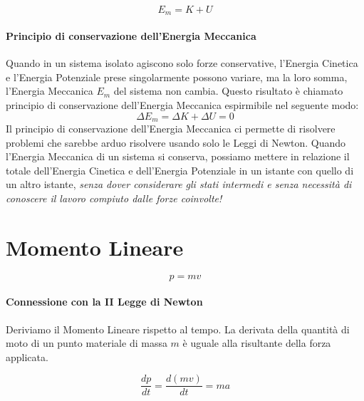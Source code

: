         \begin{equation}
            E_m = K + U
        \end{equation}

        \paragraph{Principio di conservazione dell'Energia Meccanica} Quando in 
        un sistema isolato agiscono solo forze conservative, l'Energia Cinetica 
        e l'Energia Potenziale prese singolarmente possono variare, ma la loro
        somma, l'Energia Meccanica $E_m$ del sistema non cambia. Questo 
        risultato è chiamato principio di conservazione dell'Energia Meccanica
        espirmibile nel seguente modo:
        \begin{equation}
            \Delta E_m = \Delta K + \Delta U = 0
        \end{equation}
        Il principio di conservazione dell'Energia Meccanica ci permette di 
        risolvere problemi che sarebbe arduo risolvere usando solo le Leggi di 
        Newton.
        Quando l'Energia Meccanica di un sistema si conserva, possiamo mettere
        in relazione il totale dell'Energia Cinetica e dell'Energia Potenziale
        in un istante con quello di un altro istante, \textit{senza dover
        considerare gli stati intermedi e senza necessità di conoscere il lavoro
        compiuto dalle forze coinvolte!}

        
    \section{Momento Lineare}

        \begin{equation}
            p = mv
        \end{equation}

        \paragraph{Connessione con la II Legge di Newton} Deriviamo il 
        Momento Lineare rispetto al tempo. La derivata della quantità di moto di
        un punto materiale di massa $m$ è uguale alla risultante della forza 
        applicata.

        \begin{equation*}
            \frac{dp}{dt} = \frac{d(mv)}{dt} = ma
        \end{equation*}

